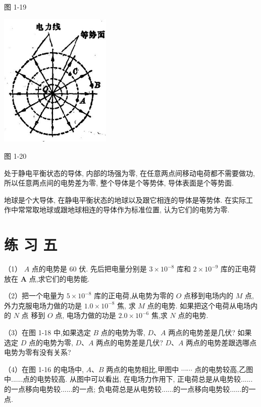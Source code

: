 \documentclass[10pt]{article}
\begin{document}
图 1-19

\begin{center}
\includegraphics[max width=0.4\textwidth]{images/01913056-1f15-74d8-9184-9aab52c9d66b_33_823248.jpg}
\end{center}

图 1-20

处于静电平衡状态的导体, 内部的场强为零, 在任意两点间移动电荷都不需要做功, 所以任意两点间的电势差为零, 整个导体是个等势体, 导体表面是个等势面.

地球是个大导体, 在静电平衡状态的地球以及跟它相连的导体是等势体. 在实际工作中常常取地球或跟地球相连的导体作为标准位置, 认为它们的电势为零.

\section*{练 习 五}

（1） \(A\) 点的电势是 60 伏. 先后把电量分别是 \(3 \times {10}^{-8}\) 库和 \(2 \times {10}^{-9}\) 库的正电荷放在 \(\mathbf{A}\) 点,求它们的电势能.

（2）把一个电量为 \(5 \times {10}^{-8}\) 库的正电荷,从电势为零的 \(O\) 点移到电场内的 \(M\) 点,外力克服电场力做的功是 \({1.0} \times {10}^{-8}\) 焦, 求 \(M\) 点的电势. 如果把这个电荷从电场内的 \(N\) 点 移到 \(O\) 点, 电场力做的功是 \({2.0} \times {10}^{-6}\) 焦,求 \(N\) 点的电势.

（3）在图 1-18 中,如果选定 \(B\) 点的电势为零, \(D\text{、}A\) 两点的电势差是几伏? 如果选定 \(D\) 点的电势为零, \(D\text{、}A\) 两点的电势差是几伏? \(D\text{、}A\) 两点的电势差跟选哪点电势为零有没有关系?

（4）在图 1-16 的电场中, \(A\text{、}B\) 两点的电势相比,甲图中 \(\cdots \cdots\) 点的电势较高,乙图中......点的电势较高. 从图中可以看出, 在电场力作用下, 正电荷总是从电势较......的一点移向电势较......的一点; 负电荷总是从电势较......的一点移向电势较......的一点.
\end{document}
